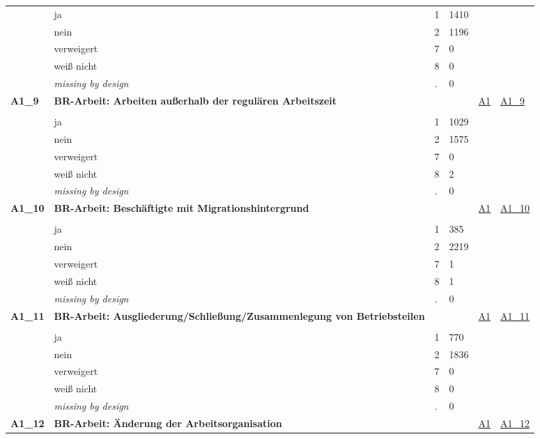 \begin{longtable}{| L{2.45cm} | L{6cm} | C{1.5cm} | R{1cm} | C{2.25cm} | C{2.25cm} |}
   & ja & 1 & 1410 &  &  \\ 
   & nein & 2 & 1196 &  &  \\ 
   & verweigert & 7 & 0 &  &  \\ 
   & weiß nicht & 8 & 0 &  &  \\ 
   & \textit{missing by design} & \textit{.} & 0 &  &  \\ 
   \midrule
\textbf{A1\_9}\label{var:A1:9} & \textbf{BR-Arbeit: Arbeiten außerhalb der regulären Arbeitszeit} &  &  & \hyperref[A1]{A1} & \hyperref[var:suf:A1:9]{A1\_9} \\ 
   &  &  &  &  &  \\ 
   & ja & 1 & 1029 &  &  \\ 
   & nein & 2 & 1575 &  &  \\ 
   & verweigert & 7 & 0 &  &  \\ 
   & weiß nicht & 8 & 2 &  &  \\ 
   & \textit{missing by design} & \textit{.} & 0 &  &  \\ 
   \midrule
\textbf{A1\_10}\label{var:A1:10} & \textbf{BR-Arbeit: Beschäftigte mit Migrationshintergrund} &  &  & \hyperref[A1]{A1} & \hyperref[var:suf:A1:10]{A1\_10} \\ 
   &  &  &  &  &  \\ 
   & ja & 1 & 385 &  &  \\ 
   & nein & 2 & 2219 &  &  \\ 
   & verweigert & 7 & 1 &  &  \\ 
   & weiß nicht & 8 & 1 &  &  \\ 
   & \textit{missing by design} & \textit{.} & 0 &  &  \\ 
   \midrule
\textbf{A1\_11}\label{var:A1:11} & \textbf{BR-Arbeit: Ausgliederung/Schließung/Zusammenlegung von Betriebsteilen} &  &  & \hyperref[A1]{A1} & \hyperref[var:suf:A1:11]{A1\_11} \\ 
   &  &  &  &  &  \\ 
   & ja & 1 & 770 &  &  \\ 
   & nein & 2 & 1836 &  &  \\ 
   & verweigert & 7 & 0 &  &  \\ 
   & weiß nicht & 8 & 0 &  &  \\ 
   & \textit{missing by design} & \textit{.} & 0 &  &  \\ 
   \midrule
\textbf{A1\_12}\label{var:A1:12} & \textbf{BR-Arbeit: Änderung der Arbeitsorganisation} &  &  & \hyperref[A1]{A1} & \hyperref[var:suf:A1:12]{A1\_12} \\ 

\end{longtable}

